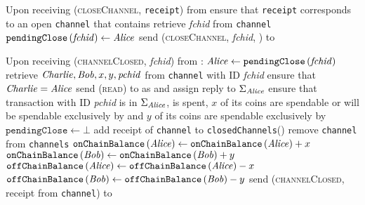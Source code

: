 \begin{functionality}{\fpaynet}
\begin{algorithmic}[1]
    \State Upon receiving (\textsc{closeChannel}, \texttt{receipt}) from \alice
     
    \Indent
      \State ensure that \texttt{receipt} corresponds to an open
      \texttt{channel} that contains \alice
      \State retrieve \textit{fchid} from \texttt{channel}
      \State $\mathtt{pendingClose}\left(\mathit{fchid}\right) \gets \mathit{Alice}$
      \State send (\textsc{closeChannel}, \textit{fchid}, \alice) to \simulator
    \EndIndent
    \State

    \State Upon receiving (\textsc{channelClosed}, \textit{fchid}) from
    \simulator:
    \Indent
      \State $\mathit{Alice} \gets \mathtt{pendingClose}\left(\mathit{fchid}\right)$
      \State retrieve $\mathit{Charlie}, \mathit{Bob}, x, y, \mathit{pchid}$ from
      \texttt{channel} with ID \textit{fchid}
      \State ensure that $\mathit{Charlie}{} = \mathit{Alice}$
      \State send (\textsc{read}) to \ledger{} as \alice{} and assign reply to
      $\Sigma_{\mathit{Alice}}$
      \State ensure that transaction with ID \textit{pchid} is in
      $\Sigma_{\mathit{Alice}}$, is spent, $x$ of its coins are spendable or
      will be spendable exclusively by \alice{} and $y$ of its coins are
      spendable exclusively by \bob
      \State $\mathtt{pendingClose} \gets \bot$
      \State add receipt of \texttt{channel} to \texttt{closedChannels}(\bob)
      \State remove \texttt{channel} from \texttt{channels}
      \State $\mathtt{onChainBalance}\left(\mathit{Alice}\right) \gets
      \mathtt{onChainBalance}\left(\mathit{Alice}\right) + x$
      \State $\mathtt{onChainBalance}\left(\mathit{Bob}\right) \gets
      \mathtt{onChainBalance}\left(\mathit{Bob}\right) + y$
      \State $\mathtt{offChainBalance}\left(\mathit{Alice}\right) \gets
      \mathtt{offChainBalance}\left(\mathit{Alice}\right) - x$
      \State $\mathtt{offChainBalance}\left(\mathit{Bob}\right) \gets
      \mathtt{offChainBalance}\left(\mathit{Bob}\right) - y$
      \State send (\textsc{channelClosed}, receipt from \texttt{channel}) to
      \alice
    \EndIndent
    \State


\end{algorithmic}
\end{functionality}
